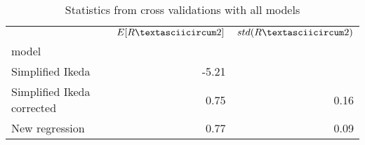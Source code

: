 
\begin{table}[H]
    \centering
    \caption{Statistics from cross validations with all models}
   \begin{tabular}{lrr}
\toprule
{} &  $E[R\textasciicircum 2]$ &  $std(R\textasciicircum 2)$ \\
model                      &           &             \\
\midrule
Simplified Ikeda           &     -5.21 &             \\
Simplified Ikeda corrected &      0.75 &        0.16 \\
New regression             &      0.77 &        0.09 \\
\bottomrule
\end{tabular}

    \label{tab:crossvalidation}
\end{table}
    